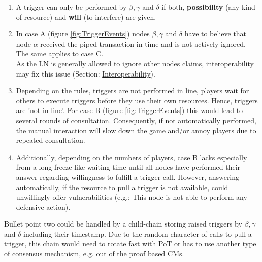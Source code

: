 \begin{enumerate}
	\item A trigger can only be performed by $\beta, \gamma$ and $\delta$ if both, \textbf{possibility} (any kind of resource) and \textbf{will} (to interfere) are given.
	
	\item In case A (figure \ref{fig:TriggerEvents}) nodes $\beta, \gamma$ and $\delta$ have to believe that node \textbf{$\alpha$} received the piped transaction in time and is not actively ignored.
	The same applies to case C. \\
	As the \gls{LN} is generally allowed to ignore other nodes claims, interoperability may fix this issue (Section: \hyperref[sec:Interoperability]{Interoperability}).
	
	\item Depending on the rules, triggers are not performed in line, players wait for others to execute triggers before they use their own resources.
	Hence, triggers are 'not in line'.
	For case B (figure \ref{fig:TriggerEvents}) this would lead to several rounds of consultation.
	Consequently, if not automatically performed, the manual interaction will slow down the game and/or annoy players due to repeated consultation.
	
	\item Additionally, depending on the numbers of players, case B lacks especially from a long freeze-like waiting time
	until all nodes have performed their answer regarding willingness to fulfill a trigger call.
	However, answering automatically, if the resource to pull a trigger is not available, could unwillingly offer vulnerabilities (e.g.: This node is not able to perform any defensive action).	
\end{enumerate}
Bullet point two could be handled by a child-chain storing raised triggers by $\beta, \gamma$ and $\delta$ including their timestamp.
Due to the random character of calls to pull a trigger, this chain would need to rotate fast with PoT or has to use another type of consensus mechanism, e.g. out of the \hyperref[sec:PbC]{proof based} \gls{CM}s.
\begin{figure}
\end{figure}



